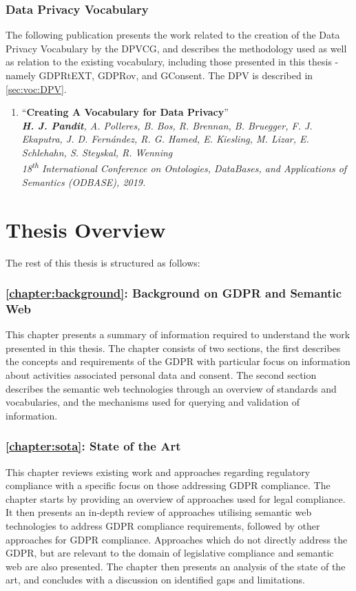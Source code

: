 \subsubsection{Data Privacy Vocabulary}
The following publication presents the work related to the creation of the Data Privacy Vocabulary by the DPVCG, and describes the methodology used as well as relation to the existing vocabulary, including those presented in this thesis - namely GDPRtEXT, GDPRov, and GConsent. The DPV is described in \autoref{sec:voc:DPV}.
\begin{enumerate}[resume]
    \item ``\textbf{Creating A Vocabulary for Data Privacy}'' \cite{pandit_creating_2019} \\
    \textit{\textbf{H. J. Pandit}, A. Polleres, B. Bos, R. Brennan, B. Bruegger, F. J. Ekaputra, J. D. Fernández, R. G. Hamed, E. Kiesling, M. Lizar, E. Schlehahn, S. Steyskal, R. Wenning} \\
    \textit{18\textsuperscript{th} International Conference on Ontologies, DataBases, and Applications of Semantics (ODBASE), 2019.}
\end{enumerate}


\section{Thesis Overview}
The rest of this thesis is structured as follows:

\subsubsection{\autoref{chapter:background}: Background on GDPR and Semantic Web}
This chapter presents a summary of information required to understand the work presented in this thesis. The chapter consists of two sections, the first describes the concepts and requirements of the GDPR with particular focus on information about activities associated personal data and consent. The second section describes the semantic web technologies through an overview of standards and vocabularies, and the mechanisms used for querying and validation of information.

\subsubsection{\autoref{chapter:sota}: State of the Art}
This chapter reviews existing work and approaches regarding regulatory compliance with a specific focus on those addressing GDPR compliance. The chapter starts by providing an overview of approaches used for legal compliance. It then presents an in-depth review of approaches utilising semantic web technologies to address GDPR compliance requirements, followed by other approaches for GDPR compliance. Approaches which do not directly address the GDPR, but are relevant to the domain of legislative compliance and semantic web are also presented. The chapter then presents an analysis of the state of the art, and concludes with a discussion on identified gaps and limitations.


